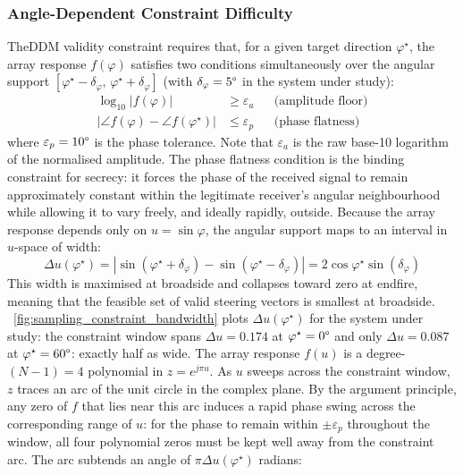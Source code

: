 \subsubsection{Angle-Dependent Constraint Difficulty}
\label{subsec:angle_dependant_constraint}
The\gls{DDM} validity constraint requires that, for a given target direction $\varphi^\star$, the array response $f(\varphi)$ satisfies two conditions simultaneously over the angular support $[\varphi^\star - \delta_\varphi,\, \varphi^\star + \delta_\varphi]$ (with $\delta_\varphi = 5\degree$ in the system under study):
\begin{align}
    \log_{10}|f(\varphi)| &\geq \varepsilon_a & &\text{(amplitude floor)}  \label{eq:ddm_amplitude} \\
    |\angle f(\varphi) - \angle f(\varphi^\star)| &\leq \varepsilon_p & &\text{(phase flatness)} \label{eq:ddm_phase}
\end{align}
where $\varepsilon_p = 10\degree$ is the phase tolerance. Note that $\varepsilon_a$ is the raw base-10 logarithm of the normalised amplitude. The phase flatness condition is the binding constraint for secrecy: it forces the phase of the received signal to remain approximately constant within the legitimate receiver's angular neighbourhood while allowing it to vary freely, and ideally rapidly, outside. Because the array response depends only on $u = \sin\varphi$, the angular support maps to an interval in $u$-space of width:
\begin{equation}
    \Delta u(\varphi^\star) = |\sin(\varphi^\star + \delta_\varphi) - \sin(\varphi^\star - \delta_\varphi)| = 2\cos\varphi^\star\sin(\delta_\varphi)
\end{equation}
This width is maximised at broadside and collapses toward zero at endfire, meaning that the feasible set of valid steering vectors is smallest at broadside. \figurename~\ref{fig:sampling_constraint_bandwidth} plots $\Delta u(\varphi^\star)$ for the system under study: the constraint window spans $\Delta u = 0.174$ at $\varphi^\star = 0\degree$ and only $\Delta u = 0.087$ at $\varphi^\star = 60\degree$: exactly half as wide.
The array response $f(u)$ is a degree-$(N-1) = 4$ polynomial in $z = e^{j\pi u}$. As $u$ sweeps across the constraint window, $z$ traces an arc of the unit circle in the complex plane. By the argument principle, any zero of $f$ that lies near this arc induces a rapid phase swing across the corresponding range of $u$: for the phase to remain within $\pm\varepsilon_p$ throughout the window, all four polynomial zeros must be kept well away from the constraint arc. The arc subtends an angle of $\pi\Delta u(\varphi^\star)$ radians:
